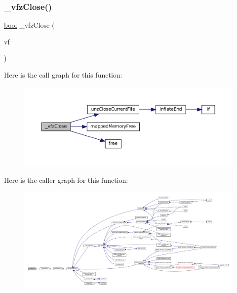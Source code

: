 \subsubsection{\texorpdfstring{\+\_\+vfz\+Close()}{\_vfzClose()}}
{\footnotesize\ttfamily \mbox{\hyperlink{libretro_8h_a4a26dcae73fb7e1528214a068aca317e}{bool}} \+\_\+vfz\+Close (\begin{DoxyParamCaption}\item[{struct V\+File $\ast$}]{vf }\end{DoxyParamCaption})\hspace{0.3cm}{\ttfamily [static]}}

Here is the call graph for this function\+:
\nopagebreak
\begin{figure}[H]
\begin{center}
\leavevmode
\includegraphics[width=350pt]{vfs-zip_8c_a9984b3be64824e3b860d6fcb2ce2a2a3_cgraph}
\end{center}
\end{figure}
Here is the caller graph for this function\+:
\nopagebreak
\begin{figure}[H]
\begin{center}
\leavevmode
\includegraphics[width=350pt]{vfs-zip_8c_a9984b3be64824e3b860d6fcb2ce2a2a3_icgraph}
\end{center}
\end{figure}
\mbox{\label{vfs-zip_8c_a2569d7414fd035ae883a93e401f2deee}} 
